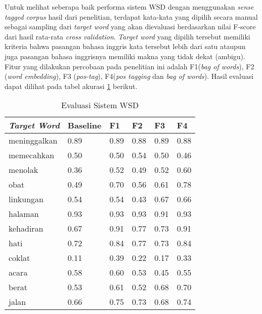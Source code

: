 Untuk melihat seberapa baik performa sistem WSD dengan menggunakan \textit{sense tagged corpus} hasil dari penelitian, terdapat kata-kata yang dipilih secara manual sebagai sampling dari \textit{target word} yang akan dievaluasi berdasarkan nilai F-score dari hasil rata-rata \textit{cross validation}. \textit{Target word} yang dipilih tersebut memiliki kriteria bahwa pasangan bahasa inggris kata tersebut lebih dari satu ataupun juga pasangan bahasa inggrisnya memiliki makna yang tidak dekat (ambigu). Fitur yang dilakukan percobaan pada penelitian ini adalah F1(\textit{bag of words}), F2 (\textit{word embedding}), F3 (\textit{pos-tag}), F4(\textit{pos tagging} dan \textit{bag of words}). Hasil evaluasi dapat dilihat pada tabel akurasi  \ref{table:wsd-evaluation} berikut.


\begin{table}
	\centering
	\caption{Evaluasi Sistem WSD}
	\label{table:wsd-evaluation}
	\begin{tabular}{|p{3cm}|p{1.5cm}|p{1.5cm}|p{1.5cm}|p{1.5cm}|p{1.5cm}|}
		\hline
		\textit{Target Word} & Baseline & F1 & F2 & F3 & F4
		\\ \hline
		meninggalkan & 0.89 & 0.89 & 0.88 & 0.89 & 0.88
		\\ \hline
		memecahkan & 0.50 & 0.50 & \cellcolor{blue!25}0.54 & 0.50 & 0.46
		\\ \hline
		menolak & 0.36 & \cellcolor{blue!25}0.52 & \cellcolor{blue!25}0.49 & \cellcolor{blue!25}0.52 & \cellcolor{blue!25}0.60
		\\ \hline
		obat & 0.49 & \cellcolor{blue!25}0.70 & \cellcolor{blue!25}0.56 & \cellcolor{blue!25}0.61 & \cellcolor{blue!25}0.78
		\\ \hline
		linkungan & 0.54 & 0.54 & 0.43 & \cellcolor{blue!25}0.67 & \cellcolor{blue!25}0.66
		\\ \hline
		halaman & 0.93 & 0.93 & 0.93 & 0.91 & 0.93
		\\ \hline
		kehadiran & 0.67 & \cellcolor{blue!25}0.91 & \cellcolor{blue!25}0.77 & \cellcolor{blue!25}0.73 & \cellcolor{blue!25}0.91
		\\ \hline
		hati & 0.72 & \cellcolor{blue!25}0.84 & \cellcolor{blue!25}0.77 & \cellcolor{blue!25}0.73 & \cellcolor{blue!25}0.84
		\\ \hline
		coklat & 0.11 & \cellcolor{blue!25}0.39 & \cellcolor{blue!25}0.22 & \cellcolor{blue!25}0.17 & \cellcolor{blue!25}0.33
		\\ \hline
		acara & 0.58 & \cellcolor{blue!25}0.60 & 0.53 & 0.45 & 0.55
		\\ \hline
		berat & 0.53 & \cellcolor{blue!25}0.61 & 0.52 & \cellcolor{blue!25}0.68 & \cellcolor{blue!25}0.70
		\\ \hline
		jalan & 0.66 & \cellcolor{blue!25}0.75 & \cellcolor{blue!25}0.73 & \cellcolor{blue!25}0.68 & \cellcolor{blue!25}0.74
		\\ \hline
	\end{tabular}
\end{table}

